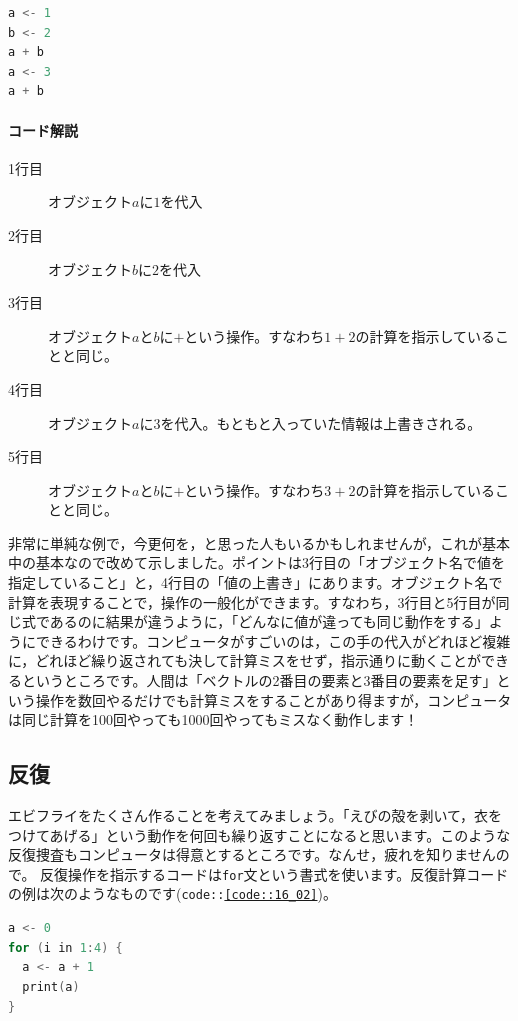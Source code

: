 \documentclass{ltjsbook}
\begin{document}
\begin{lstlisting}[language=c++,label={code::16_01},caption={代入操作}]
a <- 1
b <- 2
a + b
a <- 3
a + b
\end{lstlisting}

\paragraph{コード解説}
\begin{description}
        \item[1行目] オブジェクト$a$に$1$を代入
        \item[2行目] オブジェクト$b$に$2$を代入
        \item[3行目] オブジェクト$a$と$b$に$+$という操作。すなわち$1+2$の計算を指示していることと同じ。
        \item[4行目] オブジェクト$a$に$3$を代入。もともと入っていた情報は上書きされる。
        \item[5行目] オブジェクト$a$と$b$に$+$という操作。すなわち$3+2$の計算を指示していることと同じ。
\end{description}

非常に単純な例で，今更何を，と思った人もいるかもしれませんが，これが基本中の基本なので改めて示しました。ポイントは3行目の「オブジェクト名で値を指定していること」と，4行目の「値の上書き」にあります。オブジェクト名で計算を表現することで，操作の一般化ができます。すなわち，3行目と5行目が同じ式であるのに結果が違うように，「どんなに値が違っても同じ動作をする」ようにできるわけです。コンピュータがすごいのは，この手の代入がどれほど複雑に，どれほど繰り返されても決して計算ミスをせず，指示通りに動くことができるというところです。人間は「ベクトルの2番目の要素と3番目の要素を足す」という操作を数回やるだけでも計算ミスをすることがあり得ますが，コンピュータは同じ計算を100回やっても1000回やってもミスなく動作します！

\subsection{反復}
エビフライをたくさん作ることを考えてみましょう。「えびの殻を剥いて，衣をつけてあげる」という動作を何回も繰り返すことになると思います。このような反復捜査もコンピュータは得意とするところです。なんせ，疲れを知りませんので。
反復操作を指示するコードは\texttt{for}文という書式を使います。反復計算コードの例は次のようなものです(\texttt{code::\ref{code::16_02}})。

\begin{lstlisting}[language=c++,label={code::16_02},caption={反復操作1}]
a <- 0
for (i in 1:4) {
  a <- a + 1
  print(a)
}
\end{lstlisting}
\end{document}
